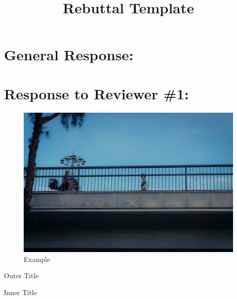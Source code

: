 \documentclass[11pt]{article}
\title{Rebuttal Template}
\date{}
\begin{document}
\maketitle
\onehalfspacing
\section{General Response:}

\lipsum[1]\cite{jiang2023detecting}

\setcounter{CommentCounter}{0} %
\section{Response to Reviewer \#1:}

\reviewercomment{\lipsum[2]}

\begin{response}
\lipsum[3]
\end{response}


\reviewercomment{\lipsum[5]}


\begin{figure}[h]
    \centering
    \includegraphics[width=1\linewidth]{example.jpeg}
    \caption{Example}
    \label{fig:example}
\end{figure}
\begin{response}

    \lipsum[6]
\end{response}

\begin{manuscriptchangeenv}{Outer Title}
    \lipsum[7]
    \begin{manuscriptchangeenv}{Inner Title}
        \lipsum[8]
    \end{manuscriptchangeenv}
\end{manuscriptchangeenv}




\end{document}
